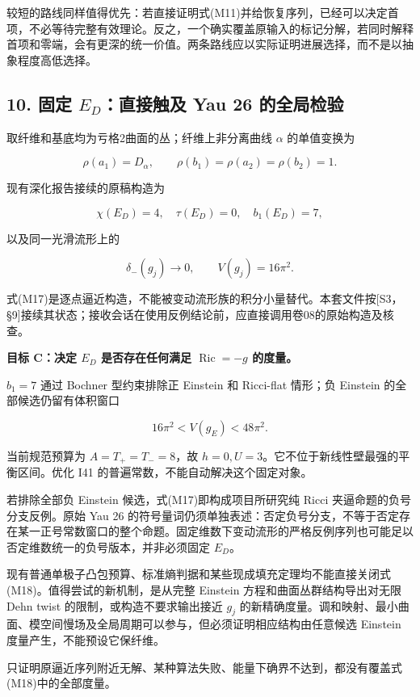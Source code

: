 \documentclass[UTF8,a4paper,11pt,fontset=fandol]{ctexart}
\begin{document}
较短的路线同样值得优先：若直接证明式(M11)并给恢复序列，已经可以决定首项，不必等待完整有效理论。反之，一个确实覆盖原输入的标记分解，若同时解释首项和零端，会有更深的统一价值。两条路线应以实际证明进展选择，而不是以抽象程度高低选择。

\subsection{\texorpdfstring{10. 固定 \(E_D\)：直接触及 Yau 26
的全局检验}{10. 固定 E\_D：直接触及 Yau 26 的全局检验}}\label{ux56faux5b9a-e_dux76f4ux63a5ux89e6ux53ca-yau-26-ux7684ux5168ux5c40ux68c0ux9a8c}

取纤维和基底均为亏格2曲面的丛；纤维上非分离曲线 \(\alpha\) 的单值变换为

\[
\rho(a_1)=D_\alpha,\qquad
\rho(b_1)=\rho(a_2)=\rho(b_2)=1.
\]

现有深化报告接续的原稿构造为

\[
\chi(E_D)=4,\quad\tau(E_D)=0,\quad b_1(E_D)=7,
\]

以及同一光滑流形上的

\[
\delta_-(g_j)\to0,\qquad V(g_j)=16\pi^2.
\tag{M17}
\]

式(M17)是逐点逼近构造，不能被变动流形族的积分小量替代。本套文件按{[}S3，§9{]}接续其状态；接收会话在使用反例结论前，应直接调用卷08的原始构造及核查。

\textbf{目标 C：决定 \(E_D\) 是否存在任何满足 \(\operatorname{Ric}=-g\)
的度量。}

\(b_1=7\) 通过 Bochner 型约束排除正 Einstein 和 Ricci-flat 情形；负
Einstein 的全部候选仍留有体积窗口

\[
16\pi^2<V(g_E)<48\pi^2.
\tag{M18}
\]

当前规范预算为 \(A=T_+=T_-=8\)，故
\(h=0,U=3\)。它不位于新线性壁最强的平衡区间。优化 I41
的普遍常数，不能自动解决这个固定对象。

若排除全部负 Einstein 候选，式(M17)即构成项目所研究纯 Ricci
夹逼命题的负号分支反例。原始 Yau 26
的符号量词仍须单独表述：否定负号分支，不等于否定存在某一正号常数窗口的整个命题。固定维数下变动流形的严格反例序列也可能足以否定维数统一的负号版本，并非必须固定
\(E_D\)。

现有普通单极子凸包预算、标准熵判据和某些现成填充定理均不能直接关闭式(M18)。值得尝试的新机制，是从完整
Einstein 方程和曲面丛群结构导出对无限 Dehn twist
的限制，或构造不要求输出接近 \(g_j\)
的新精确度量。调和映射、最小曲面、模空间慢场及全局周期可以参与，但必须证明相应结构由任意候选
Einstein 度量产生，不能预设它保纤维。

只证明原逼近序列附近无解、某种算法失败、能量下确界不达到，都没有覆盖式(M18)中的全部度量。
\end{document}
